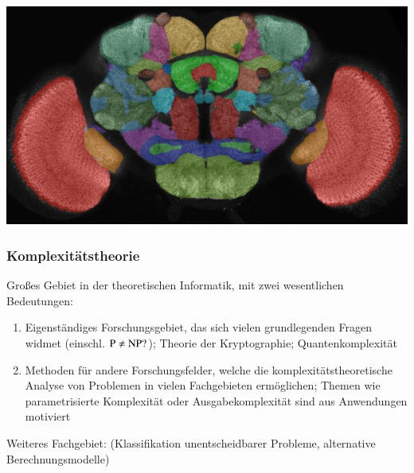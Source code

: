 \documentclass[aspectratio=1610,onlymath]{beamer}
\begin{document}
\begin{frame}\frametitle{}

~\hspace{-1.6cm}
\includegraphics[width=16.1cm]{images/fly-brain}

\end{frame}

\begin{frame}\frametitle{Komplexitätstheorie}

Großes Gebiet in der theoretischen Informatik, mit zwei wesentlichen Bedeutungen:

\begin{enumerate}[1]
\item \alert{Eigenständiges Forschungsgebiet}, das sich vielen grundlegenden Fragen widmet (einschl. ${\textsc{P}}\neq{\textsc{NP}}?$); Theorie der Kryptographie; Quantenkomplexität
% 
\item \alert{Methoden für andere Forschungsfelder}, welche die komplexitätstheoretische Analyse von Problemen
in vielen Fachgebieten ermöglichen; Themen wie parametrisierte Komplexität oder Ausgabekomplexität sind aus
Anwendungen motiviert
\end{enumerate}

Weiteres Fachgebiet:  (Klassifikation unentscheidbarer Probleme, alternative Berechnungsmodelle)

\end{frame}

% 
%
\end{document}
